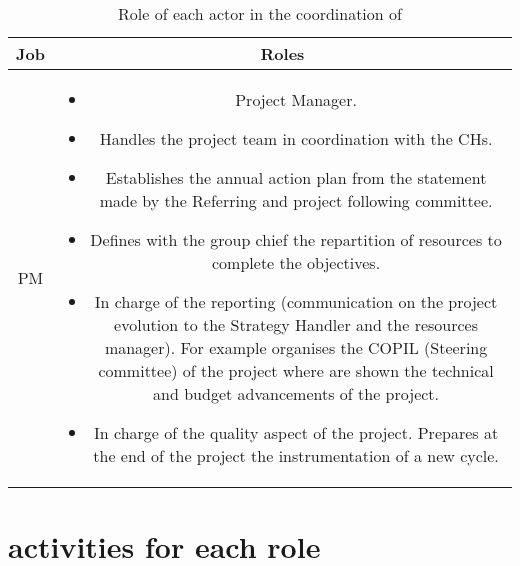 \begin{table}[h!]
\begin{tabular}{cc}
\toprule
Job & Roles \\
\midrule
PM &
\begin{minipage}[l]{14cm}
\begin{itemize}
\itemsep-5pt
\item Project Manager.
\item Handles the project team in coordination with the CHs.
\item Establishes the annual action plan from the statement made by the
  Referring and project following committee.
\item Defines with the group chief the repartition of resources to complete the
  objectives.
\item In charge of the reporting (communication on the project evolution to the
  Strategy Handler and the resources manager). For example organises the COPIL
  (Steering committee) of the project where are shown the technical and budget
  advancements of the project.
\item In charge of the quality aspect of the project. Prepares at the end of
  the project the instrumentation of a new cycle.
\end{itemize}
\end{minipage}\\
\bottomrule
\end{tabular}
\caption{\label{coord} Role of each actor in the coordination of \telemacsystem}
\end{table}

\section{\telemacsystem{} activities for each role}

